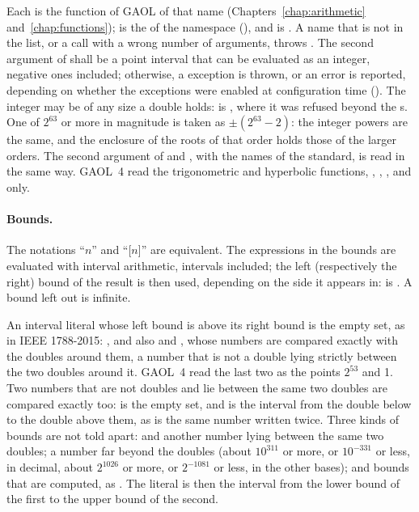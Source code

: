\documentclass[12pt,a4paper,twoside,openright]{book}
\begin{document}
\noindent
Each is the function of GAOL of that name (Chapters~\ref{chap:arithmetic}
and~\ref{chap:functions});  is the  of the namespace
 (), and  is
. A name that is not in the list, or a call with a
wrong number of arguments, throws . The second
argument of  shall be a point interval that can be evaluated
as an integer, negative ones included; otherwise, a 
exception is thrown, or an error is reported, depending on whether the
exceptions were enabled at configuration time
().\newinvfive{} The integer may be of any size a
double holds:  is
, where it was refused beyond the
s. One of $2^{63}$ or more in magnitude is taken as
$\pm(2^{63}-2)$: the integer powers are the same, and the enclosure of the
roots of that order holds those of the larger orders. The second argument of
 and , with the names of the standard, is read in the
same way. GAOL~4 read the trigonometric and hyperbolic functions,
, , ,  and  only.

\paragraph{Bounds.} The notations ``$n$'' and ``[$n$]'' are equivalent. The
expressions in the bounds are evaluated with interval arithmetic, intervals
included; the left (respectively the right) bound of the result is then
used, depending on the side it appears in:  is
. A bound left out is infinite.

An interval literal \code{[l, u]} whose left bound is above its right bound
is the empty set, as in IEEE 1788-2015: , and also
 and
, whose numbers are compared exactly with
the doubles around them, a number that is not a double lying strictly
between the two doubles around it.\newinvfive{} GAOL~4 read the last two as
the points $2^{53}$ and 1. Two numbers that are not doubles and lie between
the same two doubles are compared exactly too:
 is the empty set, and
 is the interval from
the double below to the double above them, as is the same number written
twice. Three kinds of bounds are not told apart:  and another
number lying between the same two doubles; a number far beyond the doubles
(about $10^{311}$ or more, or $10^{-331}$ or less, in decimal, about
$2^{1026}$ or more, or $2^{-1081}$ or less, in the other bases); and bounds
that are computed, as . The literal is then the interval from the
lower bound of the first to the upper bound of the second.
\end{document}
